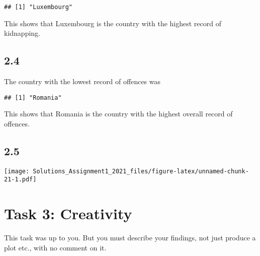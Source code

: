 \documentclass[
]{article}
\newenvironment{Shaded}{\begin{snugshade}}{\end{snugshade}}
\newcommand{\AttributeTok}[1]{\textcolor[rgb]{0.77,0.63,0.00}{#1}}
\newcommand{\DecValTok}[1]{\textcolor[rgb]{0.00,0.00,0.81}{#1}}
\newcommand{\FunctionTok}[1]{\textcolor[rgb]{0.00,0.00,0.00}{#1}}
\newcommand{\NormalTok}[1]{#1}
\newcommand{\SpecialCharTok}[1]{\textcolor[rgb]{0.00,0.00,0.00}{#1}}
\newcommand{\StringTok}[1]{\textcolor[rgb]{0.31,0.60,0.02}{#1}}
\begin{document}
\begin{Shaded}
\end{Shaded}

\begin{verbatim}
## [1] "Luxembourg"
\end{verbatim}

This shows that Luxembourg is the country with the highest record of
kidnapping.

\hypertarget{section-9}{%
\subsection{2.4}\label{section-9}}

The country with the lowest record of offences was

\begin{Shaded}
\end{Shaded}

\begin{verbatim}
## [1] "Romania"
\end{verbatim}

This shows that Romania is the country with the highest overall record
of offences.

\hypertarget{section-10}{%
\subsection{2.5}\label{section-10}}

\begin{Shaded}
\end{Shaded}

\texttt{[image: Solutions\_Assignment1\_2021\_files/figure-latex/unnamed-chunk-21-1.pdf]}

\hypertarget{task-3-creativity}{%
\section{Task 3: Creativity}\label{task-3-creativity}}

This task was up to you. But you must describe your findings, not just
produce a plot etc., with no comment on it.
\end{document}
